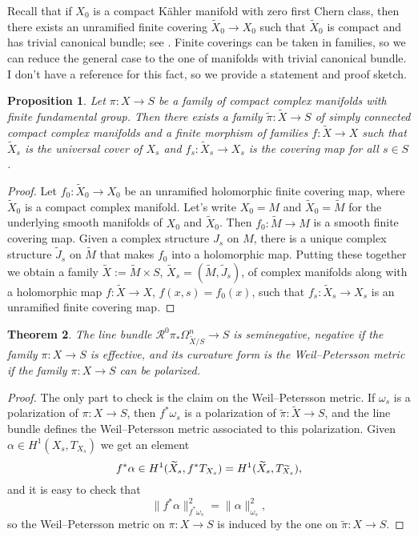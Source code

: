 \documentclass[11pt,a4paper]{amsart}
\newtheorem{theo}{Theorem}[section]
\newtheorem{prop}[theo]{Proposition}
\theoremstyle{definition}
\theoremstyle{remark}
\def\relt{\CR^0\pi_*\Omega_{\widetilde{X}/S}^n}
\def\CR{\mathcal{R}}
\begin{document}
Recall that if $X_0$ is a compact K\"ahler manifold with zero first
Chern class, then there exists an unramified finite covering
$\widetilde{X}_0 \to X_0$ such that $\widetilde{X}_0$ is compact and has
trivial canonical bundle; see \cite{MR730926}. Finite coverings can be
taken in families, so we can reduce the general case to the one of
manifolds with trivial canonical bundle. I don't have a reference for
this fact, so we provide a statement and proof sketch.



\begin{prop}
Let $\pi : X \to S$ be a family of compact complex manifolds with
finite fundamental group. Then there exists a family $\widetilde \pi :
\widetilde X \to S$ of simply connected compact complex manifolds and a
finite morphism of families $f : \widetilde X \to X$ such that
$\widetilde X_s$ is the universal cover of $X_s$ and $f_s : \widetilde
X_s \to X_s$ is the covering map for all $s \in S$.
\end{prop}

\begin{proof}
Let $f_0 : \widetilde X_0 \to X_0$ be an unramified holomorphic finite
covering map, where $\widetilde X_0$ is a compact complex manifold.
Let's write $X_0 = M$ and $\widetilde X_0 = \widetilde M$ for the
underlying smooth manifolds of $X_0$ and $\widetilde X_0$. Then $f_0 :
\widetilde M \to M$ is a smooth finite covering map. Given a complex
structure $J_s$ on $M$, there is a unique complex structure $\widetilde
J_s$ on $\widetilde M$ that makes $f_0$ into a holomorphic map.  Putting
these together we obtain a family $\widetilde X := \widetilde M \times
S$, $\widetilde X_s = (\widetilde M, \widetilde J_s)$, of complex
manifolds along with a holomorphic map $f : \widetilde X \to X$, $f(x,s)
= f_0(x)$, such that $f_s : \widetilde X_s \to X_s$ is an unramified
finite covering map.
\end{proof}




\begin{theo}
The line bundle $\relt\to S$ is seminegative, negative if the family
$\pi : X \to S$ is effective, and its curvature form is the  
Weil--Petersson metric if the family $\pi : X \to S$ can be polarized.
\end{theo}

\begin{proof}
  The only part to check is the claim on the Weil--Petersson
  metric. If $\omega_s$ is a polarization of $\pi : X \to S$, then
  $f^*\omega_s$ is a polarization of $\widetilde \pi : \widetilde X \to S$, and the
  line bundle defines the Weil--Petersson metric associated to this
  polarization. Given $\alpha \in H^1(X_s,T_{X_s})$ we get an element
$$
f^*\alpha \in H^1(\widetilde X_s, f^*T_{X_s}) = H^1(\widetilde X_s, T_{\smash{\widetilde
X_s}}),
$$
and it is easy to check that
$$
\| f^*\alpha \|^2_{f^*\omega_s} = \|\alpha\|^2_{\omega_s},
$$
so the Weil--Petersson metric on $\pi : X \to S$ is induced by the
one on $\widetilde \pi : X \to S$.
\end{proof}
\end{document}

